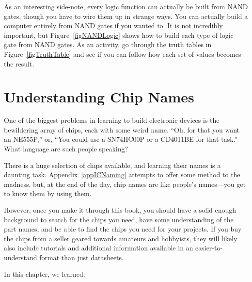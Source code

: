 As an interesting side-note, every logic function can actually be built from NAND gates, though you have to wire them up in strange ways.
You can actually build a computer entirely from NAND gates if you wanted to.
It is not incredibly important, but Figure~\ref{figNANDLogic} shows how to build each type of logic gate from NAND gates.
As an activity, go through the truth tables in Figure~\ref{figTruthTable} and see if you can follow how each set of values becomes the result.


\section{Understanding Chip Names}

One of the biggest problems in learning to build electronic devices is the bewildering array of chips, each with some weird name.
``Oh, for that you want an NE555P,'' or, ``You could use a SN74HC00P or a CD4011BE for that task.''
What language are such people speaking?

There is a huge selection of chips available, and learning their names is a daunting task.
Appendix~\ref{appICNaming} attempts to offer some method to the madness, but, at the end of the day, chip names are like people's names---you get to know them by using them.

However, once you make it through this book, you should have a solid enough background to search for the chips you need, have some understanding of the part names, and be able to find the chips you need for your projects.
If you buy the chips from a seller geared towards amateurs and hobbyists, they will likely also include tutorials and additional information available in an easier-to-understand format than just datasheets.

\reviewsection

In this chapter, we learned:

